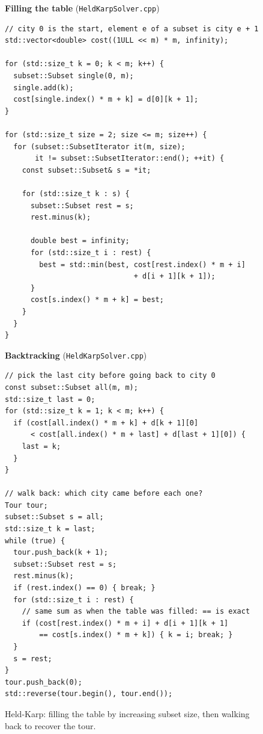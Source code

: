 \documentclass[10pt,a4paper]{article}
\begin{document}
\begin{figure}[H]
\noindent
\begin{minipage}[t]{0.49\linewidth}
\vspace{0pt}
{\footnotesize\raggedright\textbf{Filling the table} (\texttt{HeldKarpSolver.cpp})\par}
\begin{lstlisting}[style=side]
// city 0 is the start, element e of a subset is city e + 1
std::vector<double> cost((1ULL << m) * m, infinity);

for (std::size_t k = 0; k < m; k++) {
  subset::Subset single(0, m);
  single.add(k);
  cost[single.index() * m + k] = d[0][k + 1];
}

for (std::size_t size = 2; size <= m; size++) {
  for (subset::SubsetIterator it(m, size);
       it != subset::SubsetIterator::end(); ++it) {
    const subset::Subset& s = *it;

    for (std::size_t k : s) {
      subset::Subset rest = s;
      rest.minus(k);

      double best = infinity;
      for (std::size_t i : rest) {
        best = std::min(best, cost[rest.index() * m + i]
                              + d[i + 1][k + 1]);
      }
      cost[s.index() * m + k] = best;
    }
  }
}
\end{lstlisting}
\end{minipage}\hfill
\begin{minipage}[t]{0.49\linewidth}
\vspace{0pt}
{\footnotesize\raggedright\textbf{Backtracking} (\texttt{HeldKarpSolver.cpp})\par}
\begin{lstlisting}[style=side]
// pick the last city before going back to city 0
const subset::Subset all(m, m);
std::size_t last = 0;
for (std::size_t k = 1; k < m; k++) {
  if (cost[all.index() * m + k] + d[k + 1][0]
      < cost[all.index() * m + last] + d[last + 1][0]) {
    last = k;
  }
}

// walk back: which city came before each one?
Tour tour;
subset::Subset s = all;
std::size_t k = last;
while (true) {
  tour.push_back(k + 1);
  subset::Subset rest = s;
  rest.minus(k);
  if (rest.index() == 0) { break; }
  for (std::size_t i : rest) {
    // same sum as when the table was filled: == is exact
    if (cost[rest.index() * m + i] + d[i + 1][k + 1]
        == cost[s.index() * m + k]) { k = i; break; }
  }
  s = rest;
}
tour.push_back(0);
std::reverse(tour.begin(), tour.end());
\end{lstlisting}
\end{minipage}
\caption{Held-Karp: filling the table by increasing subset size, then walking back to recover the tour.}
\label{fig-hk}
\end{figure}
\end{document}
